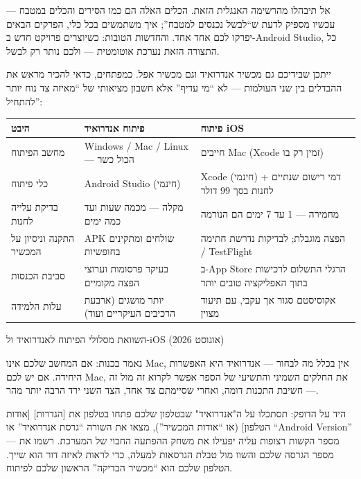 אל תיבהלו מהרשימה האנגלית הזאת. הכלים האלה הם כמו הסירים והכלים במטבח — עכשיו מספיק לדעת ש“לבשל נכנסים למטבח”; איך משתמשים בכל כלי, הפרקים הבאים יפרקו לכם אחד אחד. והחדשות הטובות: כשיוצרים פרויקט חדש ב-Android Studio, כל התצורה הזאת נערכת אוטומטית — ולכם נותר רק לבשל.


ייתכן שבידיכם גם מכשיר אנדרואיד וגם מכשיר אפל. כמפתחים, כדאי להכיר מראש את ההבדלים בין שני העולמות — לא “מי עדיף” אלא חשבון מציאותי של “מאיזה צד נוח יותר להתחיל”:

\begin{center}
\begin{tabularx}{\linewidth}{|X|X|X|}
\hline
\textbf{היבט} & \textbf{פיתוח אנדרואיד} & \textbf{פיתוח iOS} \tabularnewline
\hline
מחשב הפיתוח & Windows / Mac / Linux — הכול כשר & חייבים Mac (Xcode זמין רק בו) \tabularnewline
כלי פיתוח & Android Studio (חינמי) & Xcode (חינמי) + דמי רישום שנתיים לחנות בסך 99 דולר \tabularnewline
בדיקת עלייה לחנות & מקלה — מכמה שעות ועד כמה ימים & מחמירה — 1 עד 7 ימים הם הנורמה \tabularnewline
התקנה וניסיון על המכשיר & APK שולחים ומתקינים בחופשיות & הפצה מוגבלת; לבדיקות נדרשת חתימה / TestFlight \tabularnewline
סביבת הכנסות & בעיקר פרסומות וערוצי הפצה מקומיים & ב-App Store הרגלי התשלום לרכישות בתוך האפליקציה טובים יותר \tabularnewline
עלות הלמידה & יותר מושגים (ארבעת הרכיבים העיקריים ועוד) & אקוסיסטם סגור אך עקבי, עם תיעוד מצוין \tabularnewline
\hline
\end{tabularx}
\end{center}

\begin{center}\small\color{gray}השוואת מסלולי הפיתוח לאנדרואיד ול-iOS (אוגוסט 2026)\end{center}

נאמר בכנות: אם המחשב שלכם אינו Mac, אין בכלל מה לבחור — אנדרואיד היא האפשרות היחידה. אם יש לכם Mac, את החלקים השמיני והתשיעי של הספר אפשר לקרוא זה מול זה — חשיבת התכנות דומה, ואחרי שסיימתם צד אחד, הצד השני ירד הרבה יותר מהר.

\begin{tcbpractice}{היד על הדופק: תסתכלו על ה"אנדרואיד" שבטלפון שלכם}
פתחו בטלפון את [הגדרות] [אודות הטלפון] (או “אודות המכשיר”), מצאו את השורה “גרסת אנדרואיד” או “Android Version” — מספר הקשות רצופות עליה יפעילו את משחק ההפתעה החבוי של המערכת. רשמו את מספר הגרסה שלכם והשוו מול טבלת הגרסאות למעלה, כדי לראות לאיזה דור הוא שייך. הטלפון שלכם הוא “מכשיר הבדיקה” הראשון שלכם לפיתוח.

\end{tcbpractice}

